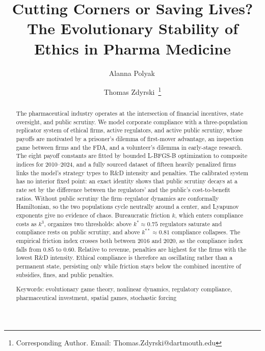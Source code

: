 \documentclass[10pt]{article}
\begin{document}
\title{\textbf{Cutting Corners or Saving Lives? \\ The Evolutionary Stability of Ethics in Pharma Medicine}}

\author[1]{Alanna Polyak\,}
\author[1]{Thomas Zdyrski\, \thanks{Corresponding Author. Email: Thomas.Zdyrski@dartmouth.edu}}

\maketitle

\begin{abstract}
The pharmaceutical industry operates at the intersection of financial incentives, state oversight, and public scrutiny. We model corporate compliance with a three-population replicator system of ethical firms, active regulators, and active public scrutiny, whose payoffs are motivated by a prisoner's dilemma of first-mover advantage, an inspection game between firms and the FDA, and a volunteer's dilemma in early-stage research. The eight payoff constants are fitted by bounded L-BFGS-B optimization to composite indices for 2010--2024, and a fully sourced dataset of fifteen heavily penalized firms links the model's strategy types to R\&D intensity and penalties. The calibrated system has no interior fixed point: an exact identity shows that public scrutiny decays at a rate set by the difference between the regulators' and the public's cost-to-benefit ratios. Without public scrutiny the firm--regulator dynamics are conformally Hamiltonian, so the two populations cycle neutrally around a center, and Lyapunov exponents give no evidence of chaos. Bureaucratic friction $k$, which enters compliance costs as $k^3$, organizes two thresholds: above $k^*\approx0.75$ regulators saturate and compliance rests on public scrutiny, and above $k^{**}\approx0.81$ compliance collapses. The empirical friction index crosses both between 2016 and 2020, as the compliance index falls from $0.85$ to $0.60$. Relative to revenue, penalties are highest for the firms with the lowest R\&D intensity. Ethical compliance is therefore an oscillating rather than a permanent state, persisting only while friction stays below the combined incentive of subsidies, fines, and public penalties.

Keywords:
evolutionary game theory,
nonlinear dynamics,
regulatory compliance,
pharmaceutical investment,
spatial games,
stochastic forcing
\end{abstract}
\end{document}
